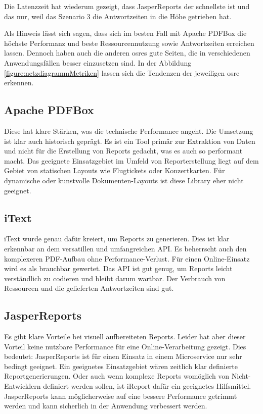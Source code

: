 \documentclass[main.tex]{subfiles}
\begin{document}
Die Latenzzeit hat wiederum gezeigt, dass JasperReports der schnellste ist und das nur, weil das Szenario 3 die Antwortzeiten in die Höhe getrieben hat.

Als Hinweis lässt sich sagen, dass sich im besten Fall mit Apache PDFBox die höchste Performanz und beste Ressourcennutzung sowie Antwortzeiten erreichen lassen. Dennoch haben auch die anderen \acrshort{osre}s gute Seiten, die in verschiedenen Anwendungsfällen besser einzusetzen sind. In der Abbildung \ref{figure:netzdiagrammMetriken} lassen sich die Tendenzen der jeweiligen \acrshort{osre} erkennen.

\subsection{Apache PDFBox}
Diese hat klare Stärken, was die technische Performance angeht. Die Umsetzung ist klar auch historisch geprägt. Es ist ein Tool primär zur Extraktion von Daten und nicht für die Erstellung von Reports gedacht, was es auch so performant macht. Das geeignete Einsatzgebiet im Umfeld von Reporterstellung liegt auf dem Gebiet von statischen Layouts wie Flugtickets oder Konzertkarten. Für dynamische oder kunstvolle Dokumenten-Layouts ist diese Library eher nicht geeignet. 


\subsection{iText}

iText wurde genau dafür kreiert, um Reports zu generieren. Dies ist klar erkennbar an dem versatillen und umfangreichen API. Es beherrscht auch den komplexeren PDF-Aufbau ohne Performance-Verlust. Für einen Online-Einsatz wird es als brauchbar gewertet. Das API ist gut genug, um Reports leicht verständlich zu codieren und bleibt darum wartbar. Der Verbrauch von Ressourcen und die gelieferten Antwortzeiten sind gut. 



\subsection{JasperReports}
Es gibt klare Vorteile bei visuell aufbereiteten Reports. Leider hat aber dieser Vorteil keine nutzbare Performance für eine Online-Verarbeitung gezeigt. Dies bedeutet: JasperReports ist für einen Einsatz in einem Microservice nur sehr bedingt geeignet. Ein geeignetes Einsatzgebiet wären zeitlich klar definierte Reportgenerierungen. Oder auch wenn komplexe Reports womöglich von Nicht-Entwicklern definiert werden sollen, ist iReport dafür ein geeignetes Hilfsmittel. JasperReports kann möglicherweise auf eine bessere Performance getrimmt werden und kann sicherlich in der Anwendung verbessert werden. 
\end{document}

